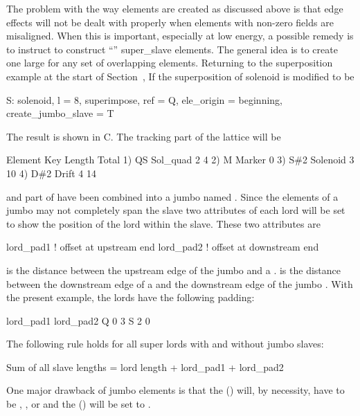 The problem with the way  elements are created as
discussed above is that edge effects will not be dealt with properly
when elements with non-zero fields are misaligned. When this is
important, especially at low energy, a possible remedy is to instruct
\bmad to construct ``'' super_slave elements. The general
idea is to create one large  for any set of
overlapping elements. Returning to the superposition example at the
start of Section~, If the superposition of solenoid 
is modified to be
\begin{example}
  S: solenoid, l = 8, superimpose, ref = Q, ele_origin = beginning, 
               create_jumbo_slave = T
\end{example}
The result is shown in C. The tracking part of the lattice
will be
\begin{example}
        Element   Key         Length  Total     
  1)    Q{\B}S       Sol_quad     2        4
  2)    M         Marker       0      
  3)    S{\#}2       Solenoid     3       10
  4)    D{\#}2       Drift        4       14
\end{example}
 and part of  have been combined into a jumbo
 named . Since the  elements
of a jumbo  may not completely span the slave two
attributes of each lord will be set to show the position of the lord
within the slave. These two attributes are
\begin{example}
  lord_pad1    ! offset at upstream end
  lord_pad2    ! offset at downstream end
\end{example}
 is the distance between the upstream edge of the jumbo
 and a .  is the distance 
between the downstream edge of a  and the downstream edge
of the jumbo . With the present example, the lords have
the following padding:
\begin{example}
          lord_pad1    lord_pad2
  Q            0            3
  S            2            0
\end{example}
The following rule holds for all super lords with and without jumbo slaves:
\begin{example}
  Sum of all slave lengths = lord length + lord_pad1 + lord_pad2
\end{example}

One major drawback of jumbo  elements is that the 
() will, by necessity, have to be , , or
 and the  () will be set to .

